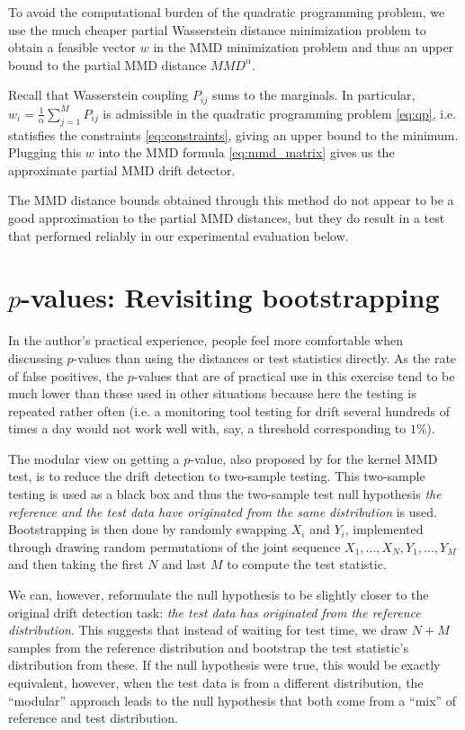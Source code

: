 \documentclass[a4paper,twoside,10pt]{article}
\theoremstyle{plain}
\theoremstyle{remark}
\begin{document}
To avoid the computational burden of the quadratic programming problem,
we use the much cheaper partial Wasserstein distance minimization problem
to obtain a feasible vector $w$ in the MMD minimization problem and thus
an upper bound to the partial MMD distance $MMD^\alpha$.

Recall that Wasserstein coupling $P_{ij}$ sums to the marginals.
In particular, $w_i = \frac{1}{\alpha} \sum_{j=1}^M P_{ij}$ is admissible in the quadratic programming problem \eqref{eq:qp}, i.e. statisfies the constraints \eqref{eq:constraints}, giving an upper bound to the minimum.
Plugging this $w$ into the MMD formula \eqref{eq:mmd_matrix} gives us the approximate partial MMD drift detector.

The MMD distance bounds obtained through this method do not appear to be a good approximation to the partial MMD distances, but they do result in a test that performed reliably in our experimental evaluation below.

\section{$p$-values: Revisiting bootstrapping}
\label{sec:bootstrapping}

In the author's practical experience, people feel more comfortable when discussing $p$-values than using the distances or test statistics directly. As the rate of false positives, the $p$-values that are of practical use in this exercise tend to be much lower than those used in other situations because here the testing is repeated rather often (i.e. a monitoring tool testing for drift several hundreds of times a day would not work well with, say, a threshold corresponding to $1\%$).

The modular view on getting a $p$-value, also proposed by \cite{FailingLoudly} for the kernel MMD test, is to reduce the drift detection to two-sample testing. This two-sample testing is used as a black box and thus the two-sample test null hypothesis \textit{the reference and the test data have originated from the same distribution} is used. Bootstrapping is then done by randomly swapping $X_i$ and $Y_i$, implemented through drawing random permutations of the joint sequence $X_1, ..., X_N, Y_1, ..., Y_M$ and then taking the first $N$ and last $M$ to compute the test statistic.

We can, however, reformulate the null hypothesis to be slightly closer to the original drift detection task: \textit{the test data has originated from the reference distribution}.
This suggests that instead of waiting for test time, we draw $N+M$ samples from the reference distribution and bootstrap the test statistic's distribution from these.
If the null hypothesis were true, this would be exactly equivalent, however, when the test data is from a different distribution, the ``modular'' approach leads to the null hypothesis that both come from a ``mix'' of reference and test distribution.
\end{document}
